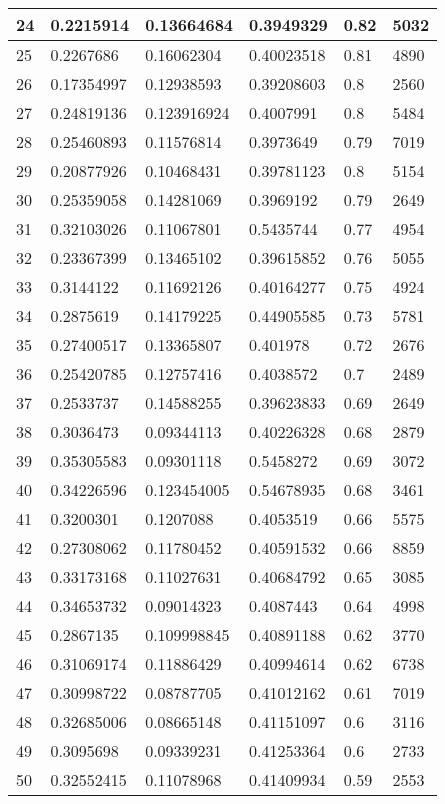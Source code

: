 \begin{longtable}{|l|l|l|l|l|l|}
24 & 0.2215914 & 0.13664684 & 0.3949329 & 0.82 & 5032 \\ \hline 
25 & 0.2267686 & 0.16062304 & 0.40023518 & 0.81 & 4890 \\ \hline 
26 & 0.17354997 & 0.12938593 & 0.39208603 & 0.8 & 2560 \\ \hline 
27 & 0.24819136 & 0.123916924 & 0.4007991 & 0.8 & 5484 \\ \hline 
28 & 0.25460893 & 0.11576814 & 0.3973649 & 0.79 & 7019 \\ \hline 
29 & 0.20877926 & 0.10468431 & 0.39781123 & 0.8 & 5154 \\ \hline 
30 & 0.25359058 & 0.14281069 & 0.3969192 & 0.79 & 2649 \\ \hline 
31 & 0.32103026 & 0.11067801 & 0.5435744 & 0.77 & 4954 \\ \hline 
32 & 0.23367399 & 0.13465102 & 0.39615852 & 0.76 & 5055 \\ \hline 
33 & 0.3144122 & 0.11692126 & 0.40164277 & 0.75 & 4924 \\ \hline 
34 & 0.2875619 & 0.14179225 & 0.44905585 & 0.73 & 5781 \\ \hline 
35 & 0.27400517 & 0.13365807 & 0.401978 & 0.72 & 2676 \\ \hline 
36 & 0.25420785 & 0.12757416 & 0.4038572 & 0.7 & 2489 \\ \hline 
37 & 0.2533737 & 0.14588255 & 0.39623833 & 0.69 & 2649 \\ \hline 
38 & 0.3036473 & 0.09344113 & 0.40226328 & 0.68 & 2879 \\ \hline 
39 & 0.35305583 & 0.09301118 & 0.5458272 & 0.69 & 3072 \\ \hline 
40 & 0.34226596 & 0.123454005 & 0.54678935 & 0.68 & 3461 \\ \hline 
41 & 0.3200301 & 0.1207088 & 0.4053519 & 0.66 & 5575 \\ \hline 
42 & 0.27308062 & 0.11780452 & 0.40591532 & 0.66 & 8859 \\ \hline 
43 & 0.33173168 & 0.11027631 & 0.40684792 & 0.65 & 3085 \\ \hline 
44 & 0.34653732 & 0.09014323 & 0.4087443 & 0.64 & 4998 \\ \hline 
45 & 0.2867135 & 0.109998845 & 0.40891188 & 0.62 & 3770 \\ \hline 
46 & 0.31069174 & 0.11886429 & 0.40994614 & 0.62 & 6738 \\ \hline 
47 & 0.30998722 & 0.08787705 & 0.41012162 & 0.61 & 7019 \\ \hline 
48 & 0.32685006 & 0.08665148 & 0.41151097 & 0.6 & 3116 \\ \hline 
49 & 0.3095698 & 0.09339231 & 0.41253364 & 0.6 & 2733 \\ \hline 
50 & 0.32552415 & 0.11078968 & 0.41409934 & 0.59 & 2553 \\ \hline 
\end{longtable}